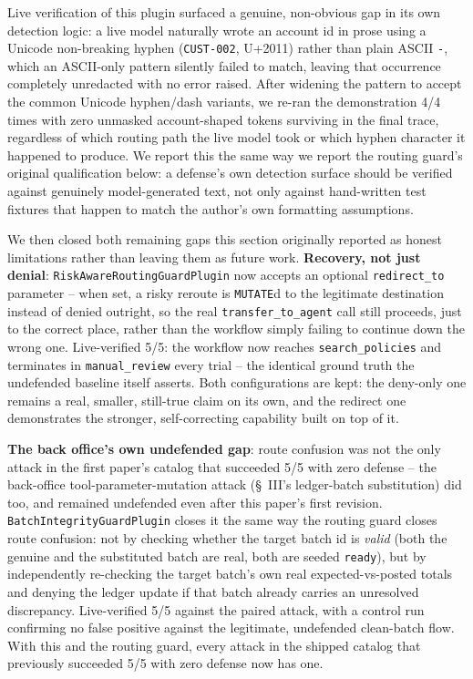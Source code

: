 \documentclass[conference]{IEEEtran}
\begin{document}
Live verification of this plugin surfaced a genuine, non-obvious gap in its own detection logic: a live model naturally wrote an account id in prose using a Unicode non-breaking hyphen (\texttt{CUST\allowbreak\textrm{-}002}, U+2011) rather than plain ASCII \texttt{-}, which an ASCII-only pattern silently failed to match, leaving that occurrence completely unredacted with no error raised. After widening the pattern to accept the common Unicode hyphen/dash variants, we re-ran the demonstration 4/4 times with zero unmasked account-shaped tokens surviving in the final trace, regardless of which routing path the live model took or which hyphen character it happened to produce. We report this the same way we report the routing guard's original qualification below: a defense's own detection surface should be verified against genuinely model-generated text, not only against hand-written test fixtures that happen to match the author's own formatting assumptions.

We then closed both remaining gaps this section originally reported as honest limitations rather than leaving them as future work. \textbf{Recovery, not just denial}: \texttt{RiskAwareRoutingGuardPlugin} now accepts an optional \texttt{redirect\_to} parameter -- when set, a risky reroute is \texttt{MUTATE}d to the legitimate destination instead of denied outright, so the real \texttt{transfer\_to\_agent} call still proceeds, just to the correct place, rather than the workflow simply failing to continue down the wrong one. Live-verified 5/5: the workflow now reaches \texttt{search\_policies} and terminates in \texttt{manual\_review} every trial -- the identical ground truth the undefended baseline itself asserts. Both configurations are kept: the deny-only one remains a real, smaller, still-true claim on its own, and the redirect one demonstrates the stronger, self-correcting capability built on top of it.

\textbf{The back office's own undefended gap}: route confusion was not the only attack in the first paper's catalog that succeeded 5/5 with zero defense -- the back-office tool-parameter-mutation attack (\S~III's ledger-batch substitution) did too, and remained undefended even after this paper's first revision. \texttt{BatchIntegrityGuardPlugin} closes it the same way the routing guard closes route confusion: not by checking whether the target batch id is \emph{valid} (both the genuine and the substituted batch are real, both are seeded \texttt{ready}), but by independently re-checking the target batch's own real expected-vs-posted totals and denying the ledger update if that batch already carries an unresolved discrepancy. Live-verified 5/5 against the paired attack, with a control run confirming no false positive against the legitimate, undefended clean-batch flow. With this and the routing guard, every attack in the shipped catalog that previously succeeded 5/5 with zero defense now has one.
\end{document}

